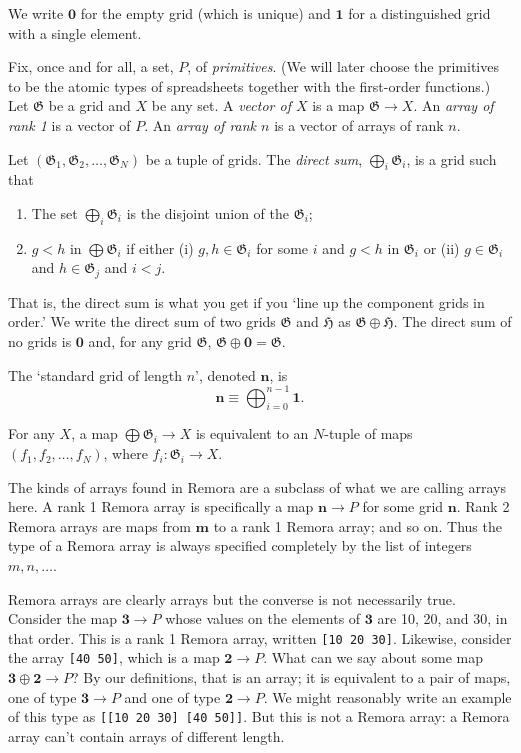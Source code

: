 \documentclass[11pt]{article}
\newcommand{\gr}[1]{\mathfrak{#1}}
\newcommand{\GG}{\gr{G}}
\newcommand{\void}{\mathbf{0}}
\newcommand{\unit}{\mathbf{1}}
\begin{document}
We write \(\void\) for the empty grid (which is unique) and $\unit$ for a
distinguished grid with a single element. 

Fix, once and for all, a set, \(P\), of \emph{primitives}. (We will later choose
the primitives to be the atomic types of spreadsheets together with the
first-order functions.) Let $\GG$ be a grid and $X$ be any set. A \emph{vector
of $X$} is a map $\GG \to X$. An \emph{array of rank 1} is a vector of $P$. An
\emph{array of rank $n$} is a vector of arrays of rank $n$. 

Let \((\GG_1, \GG_2, \dots, \GG_N)\) be a tuple of grids. The \emph{direct sum},
\(\bigoplus_i \GG_i\), is a grid such that
\begin{enumerate}
\item The set \(\bigoplus_i \GG_i\) is the disjoint union of the \(\GG_i\);
\item \(g<h\) in \(\bigoplus \GG_i\) if either (i) \(g, h\in \GG_i\) for some \(i\) and \(g<h\)
in \(\GG_i\) or (ii) \(g\in\GG_i\) and \(h\in\GG_j\) and \(i < j\).
\end{enumerate}
That is, the direct sum is what you get if you `line up the component grids in
order.' We write the direct sum of two grids \(\gr{G}\) and \(\gr{H}\) as
\(\gr{G}\oplus \gr{H}\). The direct sum of no grids is $\void$ and, for any grid
$\GG$, \(\GG\oplus\void = \GG\).

The `standard grid of length $n$', denoted $\mathbf{n}$, is
\begin{equation*}
\mathbf{n} \equiv \bigoplus_{i=0}^{n-1} \unit.
\end{equation*}

For any \(X\), a map \(\bigoplus \GG_i\to X\) is equivalent to an \(N\)-tuple of
maps \((f_1, f_2, \dots, f_N)\), where \(f_i : \GG_i\to X\).

The kinds of arrays found in Remora are a subclass of what we are calling arrays
here. A rank 1 Remora array is specifically a map \(\mathbf{n}\to P\) for some
grid \(\mathbf{n}\). Rank 2 Remora arrays are maps from \(\mathbf{m}\) to a rank 1
Remora array; and so on. Thus the type of a Remora array is always specified
completely by the list of integers \(m, n, \dotsc\).

Remora arrays are clearly arrays but the converse is not necessarily
true. Consider the map \(\mathbf{3}\to P\) whose values on the elements of
\(\mathbf{3}\) are 10, 20, and 30, in that order. This is a rank 1 Remora array,
written \texttt{[10 20 30]}. Likewise, consider the array \texttt{[40 50]}, which is a map
\(\mathbf{2}\to P\). What can we say about some map \(\mathbf{3}\oplus\mathbf{2}\to
P\)? By our definitions, that is an array; it is equivalent to a pair of maps,
one of type \(\mathbf{3}\to P\) and one of type \(\mathbf{2}\to P\). We might
reasonably write an example of this type as \texttt{[[10 20 30] [40 50]]}. But this is
not a Remora array: a Remora array can't contain arrays of different length.
\end{document}
